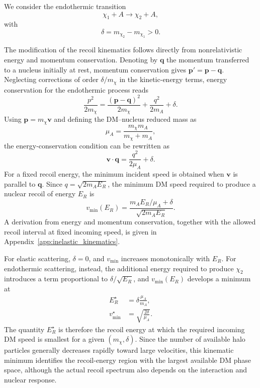 \documentclass[aps,prd,reprint,superscriptaddress,nofootinbib,longbibliography,floatfix]{revtex4-2}
\begin{document}
We consider the endothermic transition
\begin{equation}
\chi_1 + A \rightarrow \chi_2 + A,
\end{equation}
with
\begin{equation}
\delta=m_{\chi_2}-m_{\chi_1}>0.
\end{equation}

The modification of the recoil kinematics follows directly from nonrelativistic energy and momentum conservation. Denoting by $\bm q$ the momentum transferred to a nucleus initially at rest, momentum conservation gives $\bm p'=\bm p-\bm q$. Neglecting corrections of order $\delta/m_\chi$ in the kinetic-energy terms, energy conservation for the endothermic process reads
\begin{equation}
\frac{p^2}{2m_\chi}=\frac{(\bm p-\bm q)^2}{2m_\chi}+\frac{q^2}{2m_A}+\delta .
\end{equation}
Using $\bm p=m_\chi\bm v$ and defining the DM--nucleus reduced mass as
\begin{equation}
\mu_A=\frac{m_\chi m_A}{m_\chi+m_A},
\end{equation}
the energy-conservation condition can be rewritten as
\begin{equation}
\bm v\cdot\bm q=\frac{q^2}{2\mu_A}+\delta .
\end{equation}
For a fixed recoil energy, the minimum incident speed is obtained when $\bm v$ is parallel to $\bm q$. Since $q=\sqrt{2m_AE_R}$, the minimum DM speed required to produce a nuclear recoil of energy $E_R$ is \cite{TuckerSmith2001,Barello2014}
\begin{equation}
v_{\min}(E_R)=\frac{m_AE_R/\mu_A+\delta}{\sqrt{2m_AE_R}}.
\label{eq:vmin}
\end{equation}
A derivation from energy and momentum conservation, together with the allowed recoil interval at fixed incoming speed, is given in Appendix~\ref{app:inelastic_kinematics}.

For elastic scattering, $\delta=0$, and $v_{\min}$ increases monotonically with $E_R$. For endothermic scattering, instead, the additional energy required to produce $\chi_2$ introduces a term proportional to $\delta/\sqrt{E_R}$, and $v_{\min}(E_R)$ develops a minimum at
\begin{equation}
\begin{aligned}
E_R^{\star}&=\delta\frac{\mu_A}{m_A},\\
v_{\min}^{\star}&=\sqrt{\frac{2\delta}{\mu_A}}.
\end{aligned}
\label{eq:estar}
\end{equation}
The quantity $E_R^\star$ is therefore the recoil energy at which the required incoming DM speed is smallest for a given $(m_\chi,\delta)$. Since the number of available halo particles generally decreases rapidly toward large velocities, this kinematic minimum identifies the recoil-energy region with the largest available DM phase space, although the actual recoil spectrum also depends on the interaction and nuclear response.
\end{document}
